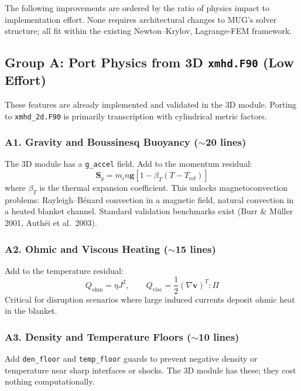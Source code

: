 \documentclass[11pt,letterpaper]{article}
\begin{document}
The following improvements are ordered by the ratio of physics impact to
implementation effort.  None requires architectural changes to MUG's solver
structure; all fit within the existing Newton--Krylov, Lagrange-FEM framework.

\subsection{Group A: Port Physics from 3D \texttt{xmhd.F90} (Low Effort)}

These features are already implemented and validated in the 3D module.
Porting to \texttt{xmhd\_2d.F90} is primarily transcription with cylindrical
metric factors.

\subsubsection{A1. Gravity and Boussinesq Buoyancy ($\sim$20 lines)}

The 3D module has a \texttt{g\_accel} field.  Add to the momentum residual:
\begin{equation}
  \mathbf{S}_g = m_i n \mathbf{g}\left[1 - \beta_T(T - T_{\mathrm{ref}})\right]
\end{equation}
where $\beta_T$ is the thermal expansion coefficient.  This unlocks
magnetoconvection problems: Rayleigh--B\'{e}nard convection in a magnetic
field, natural convection in a heated blanket channel.  Standard validation
benchmarks exist (Burr \& M\"{u}ller 2001, Auth\'{e}i et al.\ 2003).

\subsubsection{A2. Ohmic and Viscous Heating ($\sim$15 lines)}

Add to the temperature residual:
\begin{equation}
  Q_{\mathrm{ohm}} = \eta J^2, \qquad
  Q_{\mathrm{visc}} = \frac{1}{2}(\nabla\mathbf{v})^T : \Pi
\end{equation}
Critical for disruption scenarios where large induced currents deposit ohmic
heat in the blanket.

\subsubsection{A3. Density and Temperature Floors ($\sim$10 lines)}

Add \texttt{den\_floor} and \texttt{temp\_floor} guards to prevent
negative density or temperature near sharp interfaces or shocks.
The 3D module has these; they cost nothing computationally.
\end{document}
